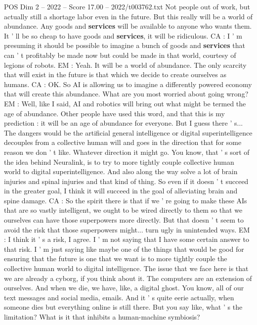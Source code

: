 \begin{textsample}{POS Dim 2 – 2022 – Score 17.00 – 2022/t003762.txt}
Not people out of work, but actually still a shortage labor even in the future.
But this really will be a world of abundance.
Any goods and \textbf{services} will be available to anyone who wants them.
It ' ll be so cheap to have goods and \textbf{services}, it will be ridiculous.
CA : I ' m presuming it should be possible to imagine a bunch of goods and \textbf{services} that can ' t profitably be made now but could be made in that world, courtesy of legions of robots.
EM : Yeah.
It will be a world of abundance.
The only scarcity that will exist in the future is that which we decide to create ourselves as humans.
CA : OK.
So AI is allowing us to imagine a differently powered economy that will create this abundance.
What are you most worried about going wrong?
EM : Well, like I said, AI and robotics will bring out what might be termed the age of abundance.
Other people have used this word, and that this is my prediction : it will be an age of abundance for everyone.
But I guess there ' s...
The dangers would be the artificial general intelligence or digital superintelligence decouples from a collective human will and goes in the direction that for some reason we don ' t like.
Whatever direction it might go.
You know, that ' s sort of the idea behind Neuralink, is to try to more tightly couple collective human world to digital superintelligence.
And also along the way solve a lot of brain injuries and spinal injuries and that kind of thing.
So even if it doesn ' t succeed in the greater goal, I think it will succeed in the goal of alleviating brain and spine damage.
CA : So the spirit there is that if we ' re going to make these AIs that are so vastly intelligent, we ought to be wired directly to them so that we ourselves can have those superpowers more directly.
But that doesn ' t seem to avoid the risk that those superpowers might... turn ugly in unintended ways.
EM : I think it ' s a risk, I agree.
I ' m not saying that I have some certain answer to that risk.
I ' m just saying like maybe one of the things that would be good for ensuring that the future is one that we want is to more tightly couple the collective human world to digital intelligence.
The issue that we face here is that we are already a cyborg, if you think about it.
The computers are an extension of ourselves.
And when we die, we have, like, a digital ghost.
You know, all of our text messages and social media, emails.
And it ' s quite eerie actually, when someone dies but everything online is still there.
But you say like, what ' s the limitation?
What is it that inhibits a human-machine symbiosis?

\end{textsample}
